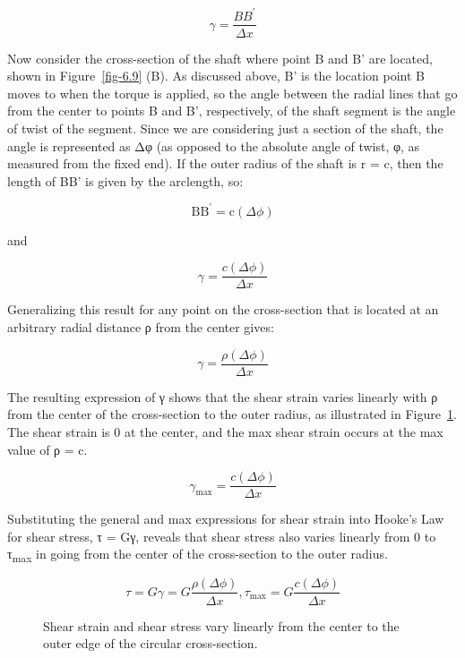 \documentclass[
  letterpaper,
  DIV=11,
  numbers=noendperiod]{scrreprt}
\theoremstyle{definition}
\theoremstyle{remark}
\begin{document}
\[
\gamma=\frac{B B^{\prime}}{\Delta x}
\]

Now consider the cross-section of the shaft where point B and B' are
located, shown in Figure~\ref{fig-6.9} (B). As discussed above, B' is
the location point B moves to when the torque is applied, so the angle
between the radial lines that go from the center to points B and B',
respectively, of the shaft segment is the angle of twist of the segment.
Since we are considering just a section of the shaft, the angle is
represented as Δφ (as opposed to the absolute angle of twist, φ, as
measured from the fixed end). If the outer radius of the shaft is r = c,
then the length of BB' is given by the arclength, so:

\[
\mathrm{BB}^{\prime}=\mathrm{c}(\Delta \phi)
\]

and

\[
\gamma=\frac{c(\Delta \phi)}{\Delta x}
\]

Generalizing this result for any point on the cross-section that is
located at an arbitrary radial distance ρ from the center gives:

\[
\gamma=\frac{\rho(\Delta \phi)}{\Delta x}
\]

The resulting expression of γ shows that the shear strain varies
linearly with ρ from the center of the cross-section to the outer
radius, as illustrated in Figure~\ref{fig-6.10}. The shear strain is 0
at the center, and the max shear strain occurs at the max value of ρ =
c.

\[
\gamma_{\max }=\frac{c(\Delta \phi)}{\Delta x}
\]

Substituting the general and max expressions for shear strain into
Hooke's Law for shear stress, τ = Gγ, reveals that shear stress also
varies linearly from 0 to τ\textsubscript{max} in going from the center
of the cross-section to the outer radius.

\[
\tau=G \gamma=G \frac{\rho(\Delta \phi)}{\Delta x}, \tau_{\max }=G \frac{c(\Delta \phi)}{\Delta x}
\]

\begin{figure}


\caption{\label{fig-6.10}Shear strain and shear stress vary linearly
from the center to the outer edge of the circular cross-section.}

\end{figure}%
\end{document}
